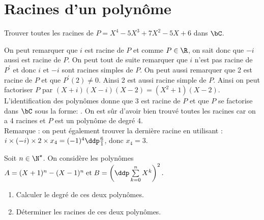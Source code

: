 \documentclass[a4paper, 11pt,reqno]{article}
\begin{document}
\vspace{0.2cm}
% 
\noindent\section{\large{Racines d'un polyn\^{o}me}}

\begin{exercice}  \;
	Trouver toutes les racines de $P=X^4-5X^3+7X^2-5X+6$ dans $\bC$.
\end{exercice}
\begin{correction}  \;
	On peut remarquer que $i$ est racine de $P$ et comme $P\in\R$, on sait donc que $-i$ aussi est racine de $P$. On peut tout de suite remarquer que $i$ n'est pas racine de $P^{\prime}$ et donc $i$ et $-i$ sont racines simples de $P$. On peut aussi remarquer que 2 est racine de $P$ et que $P^{\prime}(2)\not= 0$. Ainsi 2 est aussi racine simple de $P$.
	Ainsi on peut factoriser $P$ par $(X+i)(X-i)(X-2)=(X^2+1)(X-2)$. L'identification des polyn\^{o}mes donne que 3 est racine de $P$ et que $P$ se factorise dans $\bC$ sous la forme: . On est s\^{u}r d'avoir bien trouv\'e toutes les racines car on a 4 racines et $P$ est un polyn\^{o}me de degr\'e 4.\\
	Remarque : on peut \'egalement trouver la derni\`ere racine en utilisant : $i \times (-i) \times 2 \times x_4 = (-1)^4 \ddp\frac{6}{1}$, donc $x_4 = 3$.
\end{correction}





\begin{exercice}  \;
	Soit $n\in\N^{\star}$. On consid\`ere les polyn\^omes $A=(X+1)^n-(X-1)^n\; \hbox{et}\;B=\left(\ddp\sum\limits_{k=0}^n X^k\right)^2.$
	\begin{enumerate}
		\item Calculer le degr\'e de ces deux polyn\^omes.
		\item  D\'eterminer les racines de ces deux polyn\^omes.
	\end{enumerate}
\end{exercice}
\end{document}
